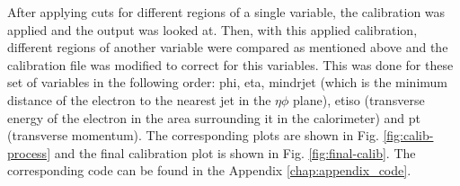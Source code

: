 \documentclass[a4paper]{report}
\numberwithin{equation}{section}
\begin{document}
After applying cuts for different regions of a single variable, the calibration was applied and the output was looked at. Then, with this applied calibration, different regions of another variable were compared as mentioned above and the calibration file was modified to correct for this variables. This was done for these set of variables in the following order: phi, eta, mindrjet (which is the minimum distance of the electron to the nearest jet in the $\eta \phi$ plane), etiso (transverse energy of the electron in the area surrounding it in the calorimeter) and pt (transverse momentum). The corresponding plots are shown in Fig. \ref{fig:calib-process} and the final calibration plot is shown in Fig. \ref{fig:final-calib}. The corresponding code can be found in the Appendix \ref{chap:appendix_code}. 
\begin{figure}[htb!]
	\centering
	\quad
	\centering
	\quad
	\centering

\end{figure}
\end{document}
